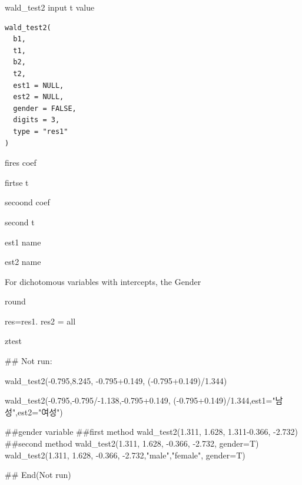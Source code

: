 \documentclass[a4paper]{book}
\begin{document}
%
\begin{Description}
wald\_test2 input t value
\end{Description}
%
\begin{Usage}
\begin{verbatim}
wald_test2(
  b1,
  t1,
  b2,
  t2,
  est1 = NULL,
  est2 = NULL,
  gender = FALSE,
  digits = 3,
  type = "res1"
)
\end{verbatim}
\end{Usage}
%
\begin{Arguments}
\begin{ldescription}
\item[\code{b1}] fires coef

\item[\code{t1}] firtse t

\item[\code{b2}] secoond coef

\item[\code{t2}] second t

\item[\code{est1}] est1 name

\item[\code{est2}] est2 name

\item[\code{gender}] For dichotomous variables with intercepts, the Gender

\item[\code{digits}] round

\item[\code{type}] res=res1. res2 = all
\end{ldescription}
\end{Arguments}
%
\begin{Value}
ztest
\end{Value}
%
\begin{Examples}
\begin{ExampleCode}
\#\# Not run: 

wald_test2(-0.795,8.245, -0.795+0.149,  (-0.795+0.149)/1.344)

wald_test2(-0.795,-0.795/-1.138,-0.795+0.149,
           (-0.795+0.149)/1.344,est1="남성",est2="여성")


##gender variable
##first method
wald_test2(1.311, 1.628, 1.311-0.366,  -2.732)
##second method
wald_test2(1.311, 1.628, -0.366,  -2.732, gender=T)
wald_test2(1.311, 1.628, -0.366,  -2.732,"male","female", gender=T)


## End(Not run)



\end{ExampleCode}
\end{Examples}
\end{document}
